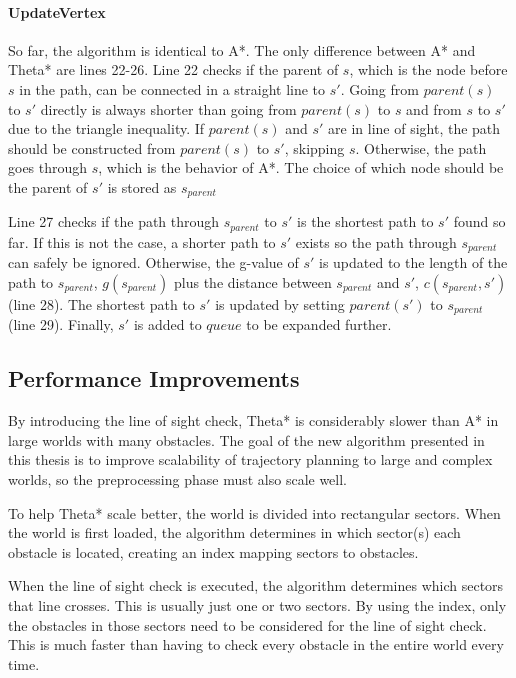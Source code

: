 \paragraph{UpdateVertex}
So far, the algorithm is identical to A*. The only difference between A* and Theta* are lines 22-26. Line 22 checks if the parent of $s$, which is the node before $s$ in the path, can be connected in a straight line to $s'$. Going from $parent(s)$ to $s'$ directly is always shorter than going from $parent(s)$ to $s$ and from $s$ to $s'$ due to the triangle inequality. If $parent(s)$ and $s'$ are in line of sight, the path should be constructed from $parent(s)$ to $s'$, skipping $s$. Otherwise, the path goes through $s$, which is the behavior  of A*. The choice of which node should be the parent of $s'$ is stored as $s_{parent}$
\par
Line 27 checks if the path through $s_{parent}$ to $s'$ is the shortest path to $s'$ found so far. If this is not the case, a shorter path to $s'$ exists so the  path through $s_{parent}$ can safely be ignored. Otherwise, the g-value of $s'$ is updated to the length of the path to $s_{parent}$, $g(s_{parent})$ plus the distance between $s_{parent}$ and $s'$, $c(s_{parent},s')$ (line 28). The shortest path to $s'$ is updated by setting $parent(s')$ to $s_{parent}$ (line 29). Finally, $s'$ is added to $queue$ to be expanded further.
\subsection{Performance Improvements}
By introducing the line of sight check, Theta* is considerably slower than A* in large worlds with many obstacles. The goal of the new algorithm presented in this thesis is to improve scalability of trajectory planning to large and complex worlds, so the preprocessing phase must also scale well.
\par
To help Theta* scale better, the world is divided into rectangular sectors. When the world is first loaded, the algorithm determines in which sector(s) each obstacle is located, creating an index mapping sectors to obstacles. \
\par
When the line of sight check is executed, the algorithm determines which sectors that line crosses. This is usually just one or two sectors. By using the index, only the obstacles in those sectors need to be considered for the line of sight check. This is much faster than having to check every obstacle in the entire world every time.



